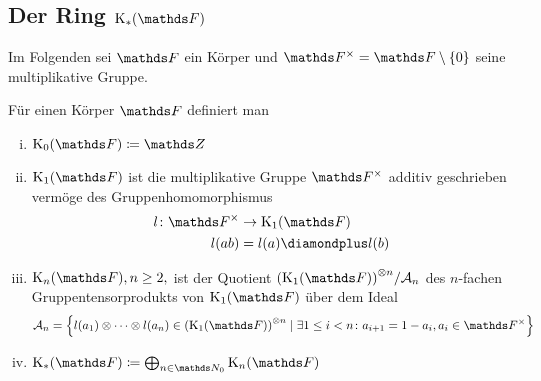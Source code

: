 \documentclass[ngerman,fontsize=11pt, paper=a4, parskip=half, titlepage=true, toc=bib]{scrartcl}
\begin{document}
\subsection{Der Ring $\KF$}
Im Folgenden sei $\F$ ein Körper und $\Fx=\F\setminus \{0\}$ seine
multiplikative Gruppe.

\begin{Def}[$\KF$]\label{defkf}
  Für einen Körper $\F$ definiert man
  \begin{enumerate}[i)]
  \item $\K_0(\F)\coloneqq \Z$
  \item $\K_1(\F)$ ist die multiplikative Gruppe $\Fx$ additiv geschrieben
    vermöge des Gruppenhomomorphismus 
    \begin{align*}
      l\colon \Fx&\to \K_1(\F)\\
      l(ab)&=l(a)\p l(b)
    \end{align*}
  \item $\KnF, n\geq 2,$ ist der Quotient 
    ${(\K_1(\F))}^{\otimes n}/\calA_n$
    des $n$-fachen Gruppentensorprodukts von $\K_1(\F)$ über dem Ideal 
    \begin{gather*}
      \calA_n=\left\{ l(a_1)\otimes\dotsb\otimes l(a_n)
        \in {(\K_1(\F))}^{\otimes n}
        \mid
        \exists 1\leq i < n \colon a_{i+1}=1-a_i, a_i\in\Fx \right\}
    \end{gather*}
  \item $\KF\coloneqq \bigoplus_{n\in\N_0}\KnF$
  \end{enumerate}
\end{Def}
\end{document}
